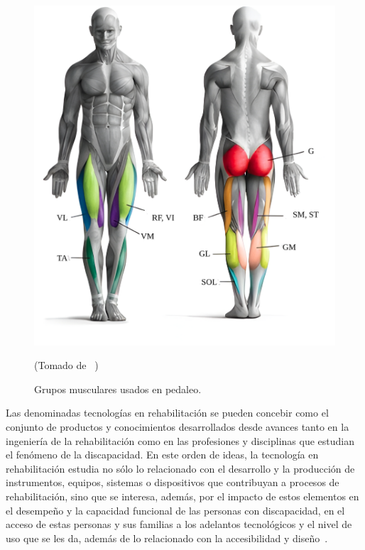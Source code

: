\begin{figure}[ht]
    \centering
    \includegraphics[scale=0.2]{images/musculegroups.png}
    \caption{Grupos musculares usados en pedaleo.}
    (Tomado de ~\cite{Quémúsc72})
    \label{fig: musculegroups}
\end{figure}

Las denominadas tecnologías en rehabilitación se pueden concebir como el conjunto de productos y conocimientos desarrollados desde avances tanto en la ingeniería de la rehabilitación como en las profesiones y disciplinas que estudian el fenómeno de la discapacidad. En este orden de ideas, la tecnología en rehabilitación estudia no sólo lo relacionado con el desarrollo y la producción de instrumentos, equipos, sistemas o dispositivos que contribuyan a procesos de rehabilitación, sino que se interesa, además, por el impacto de estos elementos en el desempeño y la capacidad funcional de las personas con discapacidad, en el acceso de estas personas y sus familias a los adelantos tecnológicos y el nivel de uso que se les da, además de lo relacionado con la accesibilidad y diseño~\cite{matheus1990tecnologia}.

